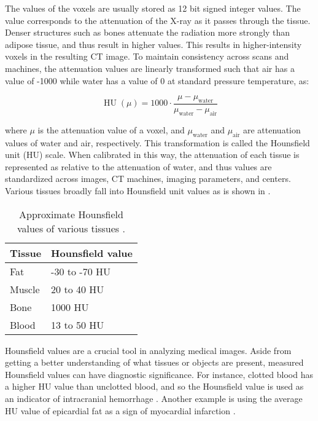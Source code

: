 The values of the voxels are usually stored as 12 bit signed integer values. The value corresponds to the attenuation of the X-ray as it passes through the tissue. Denser structures such as bones attenuate the radiation more strongly than adipose tissue, and thus result in higher values. This results in higher-intensity voxels in the resulting CT image. To maintain consistency across scans and machines, the attenuation values are linearly transformed such that air has a value of -1000 while water has a value of 0 at standard pressure temperature, as:

\begin{equation}
	{\operatorname{HU}(\mu)}=1000 \cdot {\frac {\mu -\mu _{\textrm {water}}}{\mu _{\textrm {water}}-\mu _{\textrm {air}}}}
\end{equation}

where $\mu$ is the attenuation value of a voxel, and $\mu _{\textrm {water}}$ and $\mu _{\textrm {air}}$ are attenuation values of water and air, respectively. This transformation is called the Hounsfield unit (HU) scale. When calibrated in this way, the attenuation of each tissue is represented as relative to the attenuation of water, and thus values are standardized across images, CT machines, imaging parameters, and centers. Various tissues broadly fall into Hounsfield unit values as is shown in .

\begin{table}[h!]
\centering
\begin{tabular}{l l} 
 \hline
 \textbf{Tissue} & \textbf{Hounsfield value} \\
 \hline
 Fat & -30 to -70 HU\\
 Muscle & 20 to 40 HU\\
 Bone & 1000 HU \\
 Blood & 13 to 50 HU\\
 \hline
\end{tabular}
\caption{Approximate Hounsfield values of various tissues \cite{fosbinder2011essentials, kamalianComputedTomographyImaging2016}.}
\label{table:1}
\end{table}

Hounsfield values are a crucial tool in analyzing medical images. Aside from getting a better understanding of what tissues or objects are present, measured Hounsfield values can have diagnostic significance. For instance, clotted blood has a higher HU value than unclotted blood, and so the Hounsfield value is used as an indicator of intracranial hemorrhage \cite{kamalianComputedTomographyImaging2016}. Another example is using the average HU value of epicardial fat as a sign of myocardial infarction \cite{mahabadiCardiacComputedTomographyderived2017}.

